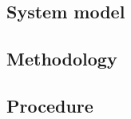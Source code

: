 \subsection{System model}
\label{sec:system-model}


\subsection{Methodology}
\label{sec:methodology}


\subsection{Procedure}
\label{sec:procedure}
